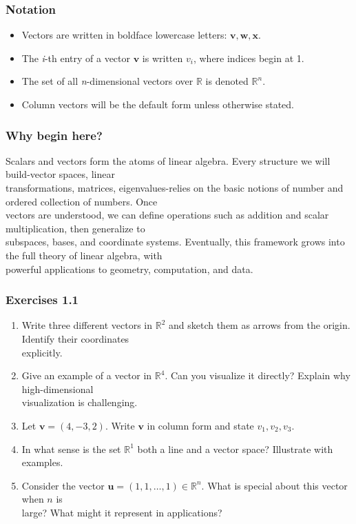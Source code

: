 \documentclass[
  12pt,
  a4paper,
]{article}
\begin{document}
\subsubsection{Notation}\label{notation}

\begin{itemize}
\item
  Vectors are written in boldface lowercase letters:
  \(\mathbf{v}, \mathbf{w}, \mathbf{x}\).
\item
  The \emph{i}-th entry of a vector \(\mathbf{v}\) is written \(v_i\),
  where indices begin at 1.
\item
  The set of all \emph{n}-dimensional vectors over \(\mathbb{R}\) is
  denoted \(\mathbb{R}^n\).
\item
  Column vectors will be the default form unless otherwise stated.
\end{itemize}

\subsubsection{Why begin here?}\label{why-begin-here}

Scalars and vectors form the atoms of linear algebra. Every structure we
will build-vector spaces, linear\\
transformations, matrices, eigenvalues-relies on the basic notions of
number and ordered collection of numbers. Once\\
vectors are understood, we can define operations such as addition and
scalar multiplication, then generalize to\\
subspaces, bases, and coordinate systems. Eventually, this framework
grows into the full theory of linear algebra, with\\
powerful applications to geometry, computation, and data.

\subsubsection{Exercises 1.1}\label{exercises-11}

\begin{enumerate}
\def\labelenumi{\arabic{enumi}.}
\item
  Write three different vectors in \(\mathbb{R}^2\) and sketch them as
  arrows from the origin. Identify their coordinates\\
  explicitly.
\item
  Give an example of a vector in \(\mathbb{R}^4\). Can you visualize it
  directly? Explain why high-dimensional\\
  visualization is challenging.
\item
  Let \(\mathbf{v} = (4, -3, 2)\). Write \(\mathbf{v}\) in column form
  and state \(v_1, v_2, v_3\).
\item
  In what sense is the set \(\mathbb{R}^1\) both a line and a vector
  space? Illustrate with examples.
\item
  Consider the vector \(\mathbf{u} = (1,1,\dots,1) \in \mathbb{R}^n\).
  What is special about this vector when \(n\) is\\
  large? What might it represent in applications?
\end{enumerate}
\end{document}
